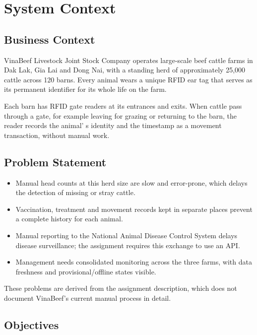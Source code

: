 \section{System Context}\label{sec:1}

\subsection{Business Context}\label{sec:1.1}

VinaBeef Livestock Joint Stock Company operates large-scale beef cattle
farms in Dak Lak, Gia Lai and Dong Nai, with a standing herd of
approximately 25,000 cattle across 120 barns. Every animal wears a
unique RFID ear tag that serves as its permanent identifier for its
whole life on the farm.

Each barn has RFID gate readers at its entrances and exits. When cattle
pass through a gate, for example leaving for grazing or returning to the
barn, the reader records the animal' s identity and the
timestamp as a movement transaction, without manual work.

\subsection{Problem Statement}\label{sec:1.2}

\begin{itemize}
\item
  Manual head counts at this herd size are slow and error-prone, which delays the detection of missing or stray cattle.
\item
  Vaccination, treatment and movement records kept in separate places prevent a complete history for each animal.
\item
  Manual reporting to the National Animal Disease Control System delays disease surveillance; the assignment requires this exchange to use an API.
\item
  Management needs consolidated monitoring across the three farms, with data
  freshness and provisional/offline states visible.
\end{itemize}

These problems are derived from the assignment description, which does
not document VinaBeef's current manual process in detail.

\subsection{Objectives}\label{sec:1.3}

